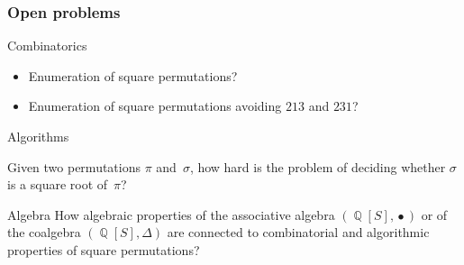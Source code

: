 \documentclass[unknownkeysallowed,10pt,xcolor={dvipsnames}]{beamer}
\DeclareMathOperator{\QQ}{\mathbb{Q}}
\DeclareMathOperator{\SHUFFLE}{\bullet}
\begin{document}
\begin{frame}
\end{frame}


\begin{frame}
  \frametitle{Open problems}

  \begin{block}{Combinatorics}
    \begin{itemize}
        \item Enumeration of square permutations?
        \smallskip

        \item Enumeration of square permutations avoiding $213$ and $231$?
    \end{itemize}
  \end{block}
  \medskip

  \begin{block}{Algorithms}

    Given two permutations $\pi$ and~$\sigma$, how hard is the problem of
    deciding whether $\sigma$ is a square root of~$\pi$?
  \end{block}
  \medskip

  \begin{block}{Algebra}
        How algebraic properties of the associative algebra $(\QQ[S], \SHUFFLE)$
        or of the coalgebra $(\QQ[S], \Delta)$ are connected to
        combinatorial and algorithmic properties of square permutations?
  \end{block}

\end{frame}

\end{document}
